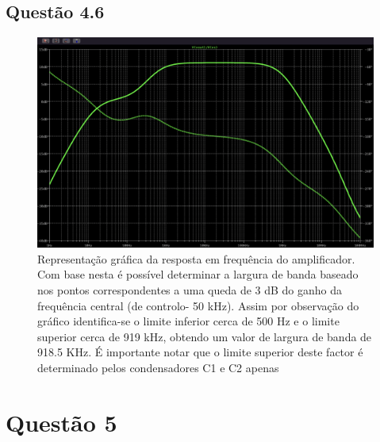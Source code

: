 \documentclass[a4paper,12pt]{article}
\begin{document}
			\subsection{Questão 4.6}
				\begin{figure}[H]
                                          \centering
                                          \captionsetup{justification=centering}
                                          \includegraphics[scale=0.3\textscale]  {4.6.png}
                                          \caption{Representação gráfica da resposta em frequência do amplificador. Com base nesta é possível determinar a largura de banda baseado nos pontos correspondentes a uma queda de 3 dB do ganho da frequência central (de controlo- 50 kHz). Assim por observação do gráfico identifica-se o limite inferior cerca de 500 Hz e o limite superior cerca de 919 kHz, obtendo um valor de largura de banda de 918.5 KHz. É importante notar que o limite superior deste factor é determinado pelos condensadores C1 e C2 apenas}
                                  \end{figure}
		\clearpage
		\section{Questão 5}
\end{document}
